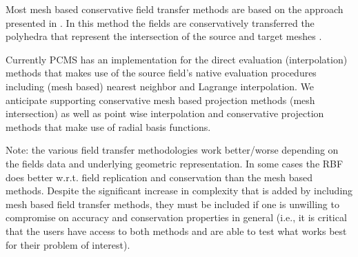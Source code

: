 \documentclass[12pt]{article}
\begin{document}
Most mesh based conservative field transfer methods are based on the approach presented in \cite{jiaoCommonrefinementbasedDataTransfer2004}. In this method the fields are conservatively transferred the polyhedra that represent the intersection of the source and target meshes \cite{blanchardHighOrderAccurate2016,jaimanConservativeLoadTransfer2006,menonConservativeInterpolationUnstructured2011,farrellConservativeInterpolationVolume2011,farrellConservativeInterpolationUnstructured2009}.

Currently PCMS has an implementation for the direct evaluation (interpolation) methods that makes use of the source field's native evaluation procedures including (mesh based) nearest neighbor and Lagrange interpolation. We anticipate supporting conservative mesh based projection methods (mesh intersection) as well as point wise interpolation and conservative projection methods that make use of radial basis functions.

Note: the various field transfer methodologies work better/worse depending on the fields data and underlying geometric representation. In some cases the RBF does better w.r.t. field replication and conservation than the mesh based methods. Despite the significant increase in complexity that is added by including mesh based field transfer methods, they must be included if one is unwilling to compromise on accuracy and conservation properties in general (i.e., it is critical that the users have access to both methods and are able to test what works best for their problem of interest).

\end{document}
